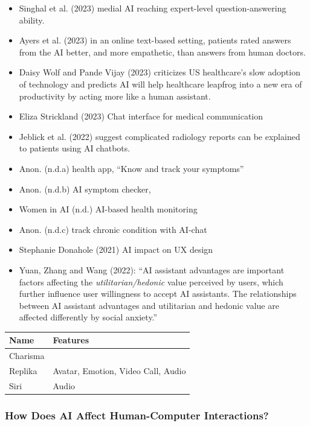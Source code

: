 \documentclass[
  letterpaper,
  DIV=11,
  numbers=noendperiod]{scrartcl}
\begin{document}
\begin{itemize}
\item
  Singhal et al. (2023) medial AI reaching expert-level
  question-answering ability.
\item
  Ayers et al. (2023) in an online text-based setting, patients rated
  answers from the AI better, and more empathetic, than answers from
  human doctors.
\item
  Daisy Wolf and Pande Vijay (2023) criticizes US healthcare's slow
  adoption of technology and predicts AI will help healthcare leapfrog
  into a new era of productivity by acting more like a human assistant.
\item
  Eliza Strickland (2023) Chat interface for medical communication
\item
  Jeblick et al. (2022) suggest complicated radiology reports can be
  explained to patients using AI chatbots.
\item
  Anon. (n.d.a) health app, ``Know and track your symptoms''
\item
  Anon. (n.d.b) AI symptom checker,
\item
  Women in AI (n.d.) AI-based health monitoring
\item
  Anon. (n.d.c) track chronic condition with AI-chat
\item
  Stephanie Donahole (2021) AI impact on UX design
\item
  Yuan, Zhang and Wang (2022): ``AI assistant advantages are important
  factors affecting the \emph{utilitarian/hedonic} value perceived by
  users, which further influence user willingness to accept AI
  assistants. The relationships between AI assistant advantages and
  utilitarian and hedonic value are affected differently by social
  anxiety.''
\end{itemize}

\begin{longtable}[]{@{}ll@{}}
\toprule\noalign{}
Name & Features \\
\midrule\noalign{}
\endhead
\bottomrule\noalign{}
\endlastfoot
Charisma & \\
Replika & Avatar, Emotion, Video Call, Audio \\
Siri & Audio \\
\end{longtable}

\subsubsection{How Does AI Affect Human-Computer
Interactions?}\label{how-does-ai-affect-human-computer-interactions}
\end{document}
